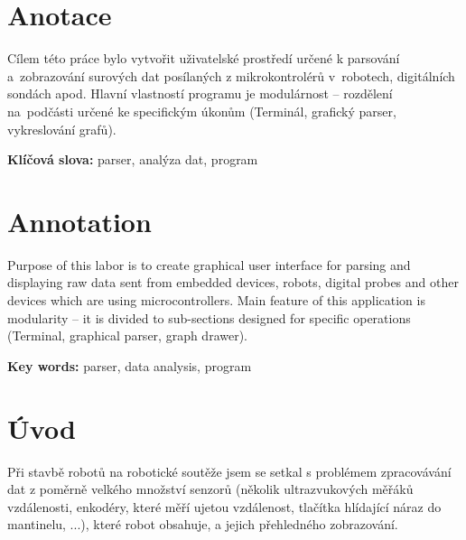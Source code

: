 \documentclass[12pt, a4paper, oneside]{article}
\newcommand{\D}{\medskip \noindent} %
\newcommand{\B}{\textbf} %
\begin{document}
\section*{Anotace }

    Cílem této práce bylo vytvořit uživatelské prostředí určené k parsování a~zobrazování surových dat posílaných z mikrokontrolérů v~robotech, digitálních sondách apod. 
Hlavní vlastností programu je modulárnost -- rozdělení na~podčásti určené ke specifickým úkonům (Terminál, grafický parser, vykreslování grafů).

\D \B{Klíčová slova:} parser, analýza dat, program

\section*{Annotation}

    Purpose of this labor is to create graphical user interface for parsing and displaying raw data sent from embedded devices, robots, digital probes and other devices which are using microcontrollers.
Main feature of this application is modularity -- it is divided to sub-sections designed for specific operations (Terminal, graphical parser, graph drawer).

\D \B{Key words:} parser, data analysis, program

\addtolength{\textheight}{30mm} %

\newpage

\setlength{\voffset}{-20mm} %

\tableofcontents  %

\addtolength{\textheight}{-30mm} %
\newpage
\setlength{\voffset}{0mm} %
\pagestyle{plain}
\section*{Úvod}

Při stavbě robotů na robotické soutěže jsem se setkal s problémem zpracovávání dat z poměrně velkého množství senzorů (několik ultrazvukových měřáků vzdálenosti, enkodéry, které měří ujetou vzdálenost, tlačítka hlídající náraz do mantinelu, ...), které robot obsahuje, a jejich přehledného zobrazování. 
\end{document}
